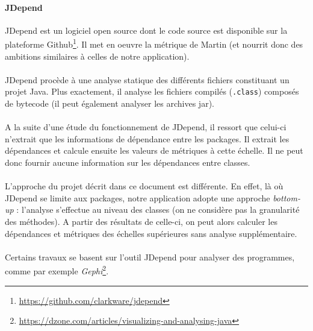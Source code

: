 \documentclass{scrartcl}
\begin{document}
    \paragraph{JDepend}JDepend est un logiciel open source dont le code source est disponible sur la plateforme Github\footnote{\url{https://github.com/clarkware/jdepend}}. Il met en oeuvre la métrique de Martin (et nourrit donc des ambitions similaires à celles de notre application).

    \paragraph{}JDepend procède à une analyse statique des différents fichiers constituant un projet Java. Plus exactement, il analyse les fichiers compilés (\texttt{.class}) composés de bytecode (il peut également analyser les archives jar).
    
    \paragraph{}A la suite d'une étude du fonctionnement de JDepend, il ressort que celui-ci n'extrait que les informations de dépendance entre les packages. Il extrait les dépendances et calcule ensuite les valeurs de métriques à cette échelle. Il ne peut donc fournir aucune information sur les dépendances entre classes. 
    
    \paragraph{}L'approche du projet décrit dans ce document est différente. En effet, là où JDepend se limite aux packages, notre application adopte une approche \textit{bottom-up} : l'analyse s'effectue au niveau des classes (on ne considère pas la granularité des méthodes).
    A partir des résultats de celle-ci, on peut alors calculer les dépendances et métriques des échelles supérieures sans analyse supplémentaire.
    
    \paragraph{}Certains travaux se basent sur l'outil JDepend pour analyser des programmes, comme par exemple \textit{Gephi}\footnote{\url{https://dzone.com/articles/visualizing-and-analysing-java}}.






\end{document}
